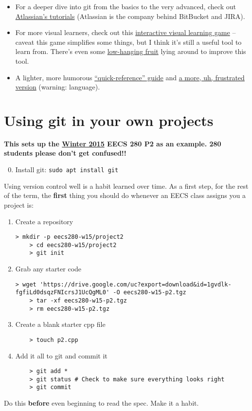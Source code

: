 \documentclass{article}
\begin{document}
\begin{itemize}
  \item For a deeper dive into git from the basics to the very advanced, check
    out \href{https://www.atlassian.com/git/tutorials}{Atlassian's tutorials}
    (Atlassian is the company behind BitBucket and JIRA).
  \item For more visual learners, check out this
    \href{http://pcottle.github.io/learnGitBranching/}{interactive visual
    learning game} -- caveat this game simplifies some things, but I think
    it's still a useful tool to learn from.  There's even some
    \href{https://github.com/pcottle/learnGitBranching/issues/201}{low-hanging
    fruit} lying around to improve this tool.
  \item A lighter, more humorous
    \href{http://adriansampson.net/blog/git.html}{``quick-reference'' guide}
    and \href{http://ohshitgit.com/}{a more, uh, frustrated version} (warning:
    language).
\end{itemize}


\newpage
\section{Using git in your own projects}
\textbf{\color{red} This sets up the \ul{Winter 2015} EECS 280 P2 as
an example. 280 students please don't get confused!!}
\begin{enumerate}
    \setcounter{enumi}{-1}
  \item Install git: \texttt{sudo apt install git}
\end{enumerate}
\noindent
Using version control well is a habit learned over time. As a first step, for
the rest of the term, the \textbf{first} thing you should do whenever an EECS
class assigns you a project is:
\begin{enumerate}
  \item Create a repository
    \begin{Verbatim}[fontsize=\footnotesize]
    > mkdir -p eecs280-w15/project2
    > cd eecs280-w15/project2
    > git init
    \end{Verbatim}
  \item Grab any starter code
    \begin{Verbatim}[fontsize=\scriptsize]
    > wget 'https://drive.google.com/uc?export=download&id=1gvdlk-fgfiLd0dsqzFNIcrsJ1UcQgML0' -O eecs280-w15-p2.tgz
    > tar -xf eecs280-w15-p2.tgz
    > rm eecs280-w15-p2.tgz
    \end{Verbatim}
  \item Create a blank starter cpp file
    \begin{lstlisting}
    > touch p2.cpp
    \end{lstlisting}
  \item Add it all to git and commit it
    \begin{lstlisting}
    > git add *
    > git status # Check to make sure everything looks right
    > git commit
    \end{lstlisting}
\end{enumerate}
Do this \textbf{before} even beginning to read the spec. Make it a habit.
\end{document}
